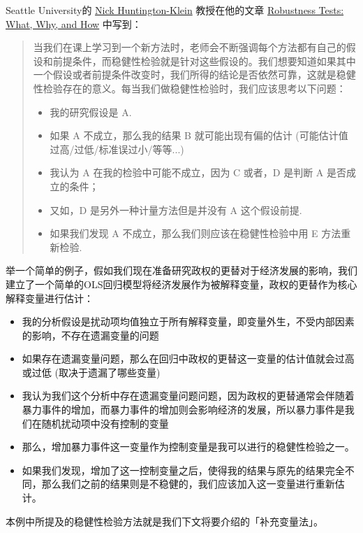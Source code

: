 \documentclass[11pt,a4paper]{ctexart}
\begin{document}
Seattle University的 \href{http://nickchk.com/}{Nick Huntington-Klein}
教授在他的文章 \href{http://www.nickchk.com/robustness.html}{Robustness
Tests: What, Why, and How} 中写到：

\begin{quote}
当我们在课上学习到一个新方法时，老师会不断强调每个方法都有自己的假设和前提条件，而稳健性检验就是针对这些假设的。我们想要知道如果其中一个假设或者前提条件改变时，我们所得的结论是否依然可靠，这就是稳健性检验存在的意义。每当我们做稳健性检验时，我们应该思考以下问题：

\begin{itemize}
\item
  我的研究假设是 A.
\item
  如果 A 不成立，那么我的结果 B 就可能出现有偏的估计
  (可能估计值过高/过低/标准误过小/等等...)
\item
  我认为 A 在我的检验中可能不成立，因为 C 或者，D 是判断 A
  是否成立的条件；
\item
  又如，D 是另外一种计量方法但是并没有 A 这个假设前提.
\item
  如果我们发现 A 不成立，那么我们则应该在稳健性检验中用 E 方法重新检验.
\end{itemize}
\end{quote}

举一个简单的例子，假如我们现在准备研究政权的更替对于经济发展的影响，我们建立了一个简单的OLS回归模型将经济发展作为被解释变量，政权的更替作为核心解释变量进行估计：

\begin{itemize}
\item
  我的分析假设是扰动项均值独立于所有解释变量，即变量外生，不受内部因素的影响，不存在遗漏变量的问题
\item
  如果存在遗漏变量问题，那么在回归中政权的更替这一变量的估计值就会过高或过低
  (取决于遗漏了哪些变量)
\item
  我认为我们这个分析中存在遗漏变量问题问题，因为政权的更替通常会伴随着暴力事件的增加，而暴力事件的增加则会影响经济的发展，所以暴力事件是我们在随机扰动项中没有控制的变量
\item
  那么，增加暴力事件这一变量作为控制变量是我可以进行的稳健性检验之一。
\item
  如果我们发现，增加了这一控制变量之后，使得我的结果与原先的结果完全不同，那么我们之前的结果则是不稳健的，我们应该加入这一变量进行重新估计。
\end{itemize}

本例中所提及的稳健性检验方法就是我们下文将要介绍的「补充变量法」。
\end{document}
